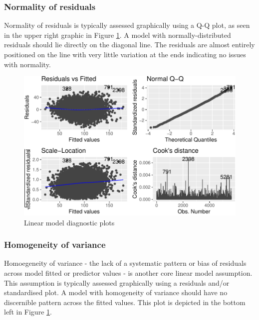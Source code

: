 \documentclass{article}
\begin{document}
\hypertarget{normality-of-residuals}{%
\subsubsection{Normality of residuals}\label{normality-of-residuals}}

Normality of residuals is typically assessed graphically using a Q-Q plot, as seen in the upper right graphic in Figure \ref{fig:diagnostics}. A model with normally-distributed residuals should lie directly on the diagonal line. The residuals are almost entirely positioned on the line with very little variation at the ends indicating no issues with normality.

\begin{figure}
\centering
\includegraphics{OLET5608_TrentHenderson_files/figure-latex/diagnostics-1.pdf}
\caption{\label{fig:diagnostics}Linear model diagnostic plots}
\end{figure}

\hypertarget{homogeneity-of-variance}{%
\subsubsection{Homogeneity of variance}\label{homogeneity-of-variance}}

Homoegeneity of variance - the lack of a systematic pattern or bias of residuals across model fitted or predictor values - is another core linear model assumption. This assumption is typically assessed graphically using a residuals and/or standardised plot. A model with homogeneity of variance should have no discernible pattern across the fitted values. This plot is depicted in the bottom left in Figure \ref{fig:diagnostics}.
\end{document}
